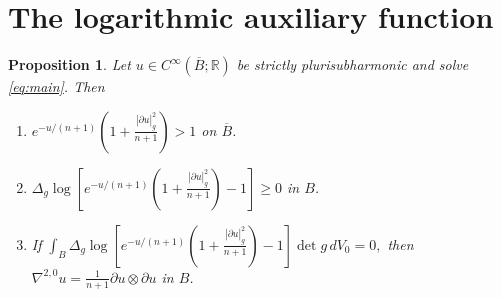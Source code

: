 \documentclass[11pt]{article}
\newtheorem{proposition}[theorem]{Proposition}
\newcommand{\R}{\mathbb R}
\begin{document}
\section{The logarithmic auxiliary function}
\begin{proposition}\label{prop:P}
Let $u\in C^\infty(\overline B;\R)$ be strictly plurisubharmonic
and solve \eqref{eq:main}. Then
\begin{enumerate}
\item[(1)] $\displaystyle
 e^{-u/(n+1)}\left(1+\frac{|\partial u|_g^2}{n+1}\right)>1$
on $\overline B$.

\item[(2)] $\displaystyle
 \Delta_g\log\left[e^{-u/(n+1)}
 \left(1+\frac{|\partial u|_g^2}{n+1}\right)-1\right]\ge0$
in $B$.

\item[(3)] If
$
 \int_B\Delta_g\log\left[
 e^{-u/(n+1)}\left(1+\frac{|\partial u|_g^2}{n+1}\right)-1
 \right]\det g\,dV_0=0,
$
then
$ \nabla^{2,0}u=\frac1{n+1}\partial u\otimes\partial u$ in $B$.
\end{enumerate}
\end{proposition}
\end{document}
